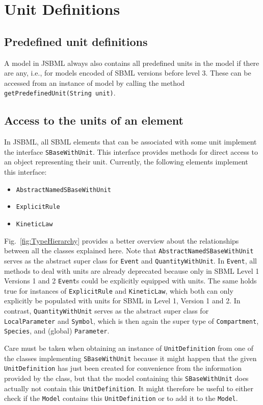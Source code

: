 \documentclass[
  BCOR12mm,
  letterpaper,
  11pt,
  headsepline,
  pointlessnumbers,
  tablecaptionabove,
  headinclude,
  appendixprefix,
  idxtotoc,
  bibtotoc,
  twoside,
  titlepage
]{scrartcl}
\begin{document}
\section{Unit Definitions}

\subsection{Predefined unit definitions}

A model in JSBML always also contains all predefined units in the model
if there are any, i.e., for models encoded of SBML versions before level
3. These can be accessed from an instance of model by calling the method
\verb!getPredefinedUnit(String unit)!.

\subsection{Access to the units of an element}

In JSBML, all SBML elements that can be associated with some unit implement the
interface \verb!SBaseWithUnit!. This interface provides methods for direct
access to an object representing their unit. Currently, the following elements
implement this interface:
\begin{itemize}
 \item \verb!AbstractNamedSBaseWithUnit!
 \item \verb!ExplicitRule!
 \item \verb!KineticLaw!
\end{itemize}
Fig.~\vref{fig:TypeHierarchy} provides a better overview about the relationships
between all the classes explained here.
Note that \verb!AbstractNamedSBaseWithUnit! serves as the abstract super class
for \verb!Event! and \verb!QuantityWithUnit!. In \verb!Event!, all methods to
deal with units are already deprecated because only in SBML Level 1 Versions 1
and 2 \verb!Event!s could be explicitly equipped with units. The same holds true
for instances of \verb!ExplicitRule! and \verb!KineticLaw!, which both can only
explicitly be populated with units for SBML in Level 1, Version 1 and 2. In
contrast, \verb!QuantityWithUnit! serves as the abstract super class for
\verb!LocalParameter! and \verb!Symbol!, which is then again the super type of
\verb!Compartment!, \verb!Species!, and (global) \verb!Parameter!.

Care must be taken when obtaining an instance of \verb!UnitDefinition! from one
of the classes implementing \verb!SBaseWithUnit!
because it might happen that the given \verb!UnitDefinition! has just been
created for convenience from the information provided by the class, but that the
model containing this \verb!SBaseWithUnit! does actually not contain this
\verb!UnitDefinition!. It might therefore be useful to either check if the
\verb!Model! contains this \verb!UnitDefinition! or to add it to the
\verb!Model!.
\end{document}
